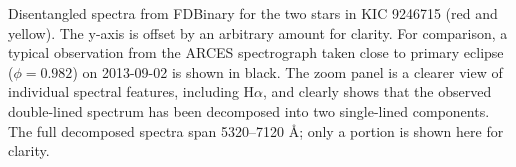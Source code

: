 \label{fig:twospectra} Disentangled spectra from FDBinary for the two stars in KIC 9246715 (red and yellow). The y-axis is offset by an arbitrary amount for clarity. For comparison, a typical observation from the ARCES spectrograph taken close to primary eclipse ($\phi = 0.982$) on 2013-09-02 is shown in black. The zoom panel is a clearer view of individual spectral features, including $\textrm{H}\alpha$, and clearly shows that the observed double-lined spectrum has been decomposed into two single-lined components. The full decomposed spectra span 5320--7120 \AA; only a portion is shown here for clarity.